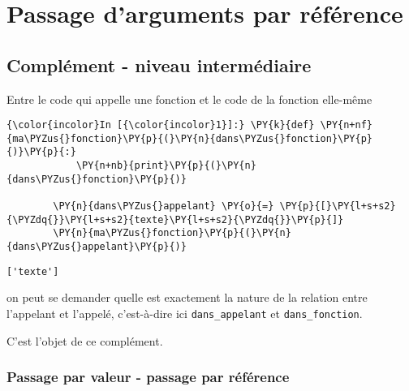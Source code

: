     
    
    
    

    

    \hypertarget{passage-darguments-par-ruxe9fuxe9rence}{%
\section{Passage d'arguments par
référence}\label{passage-darguments-par-ruxe9fuxe9rence}}

    \hypertarget{compluxe9ment---niveau-intermuxe9diaire}{%
\subsection{Complément - niveau
intermédiaire}\label{compluxe9ment---niveau-intermuxe9diaire}}

    Entre le code qui appelle une fonction et le code de la fonction
elle-même

    \begin{Verbatim}[commandchars=\\\{\},frame=single,framerule=0.3mm,rulecolor=\color{cellframecolor}]
{\color{incolor}In [{\color{incolor}1}]:} \PY{k}{def} \PY{n+nf}{ma\PYZus{}fonction}\PY{p}{(}\PY{n}{dans\PYZus{}fonction}\PY{p}{)}\PY{p}{:}
            \PY{n+nb}{print}\PY{p}{(}\PY{n}{dans\PYZus{}fonction}\PY{p}{)}
            
        \PY{n}{dans\PYZus{}appelant} \PY{o}{=} \PY{p}{[}\PY{l+s+s2}{\PYZdq{}}\PY{l+s+s2}{texte}\PY{l+s+s2}{\PYZdq{}}\PY{p}{]}
        \PY{n}{ma\PYZus{}fonction}\PY{p}{(}\PY{n}{dans\PYZus{}appelant}\PY{p}{)}
\end{Verbatim}


    \begin{Verbatim}[commandchars=\\\{\},frame=single,framerule=0.3mm,rulecolor=\color{cellframecolor}]
['texte']
\end{Verbatim}

    on peut se demander quelle est exactement la nature de la relation entre
l'appelant et l'appelé, c'est-à-dire ici \texttt{dans\_appelant} et
\texttt{dans\_fonction}.

C'est l'objet de ce complément.

    \hypertarget{passage-par-valeur---passage-par-ruxe9fuxe9rence}{%
\subsubsection{Passage par valeur - passage par
référence}\label{passage-par-valeur---passage-par-ruxe9fuxe9rence}}

